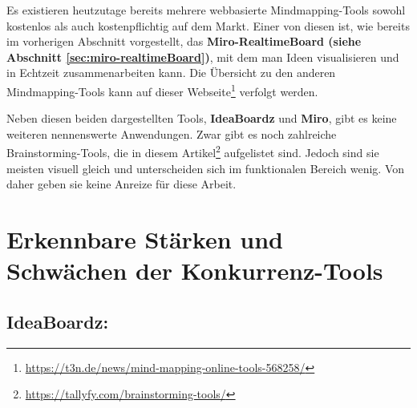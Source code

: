 Es existieren heutzutage bereits mehrere webbasierte Mindmapping-Tools sowohl kostenlos als auch kostenpflichtig auf dem Markt. Einer von diesen ist, wie bereits im vorherigen Abschnitt vorgestellt, das \textbf{Miro-RealtimeBoard (siehe Abschnitt \ref{sec:miro-realtimeBoard})}, mit dem man Ideen visualisieren und in Echtzeit zusammenarbeiten kann. Die Übersicht zu den anderen Mindmapping-Tools kann auf dieser Webseite\footnote{\url{https://t3n.de/news/mind-mapping-online-tools-568258/}} verfolgt werden.

Neben diesen beiden dargestellten Tools, \textbf{IdeaBoardz} und \textbf{Miro}, gibt es keine weiteren nennenswerte Anwendungen. Zwar gibt es noch zahlreiche Brainstorming-Tools, die in diesem Artikel\footnote{\url{https://tallyfy.com/brainstorming-tools/}} aufgelistet sind. Jedoch sind sie meisten visuell gleich und unterscheiden sich im funktionalen Bereich wenig. Von daher geben sie keine Anreize für diese Arbeit. 

\newpage
\section{Erkennbare Stärken und Schwächen der Konkurrenz-Tools}
\label{sec:erkennbare stärken und schwächen der konkurrenzTools}
\subsection{IdeaBoardz:}
\label{sec:ideaBoardz stärken und schwächen}

